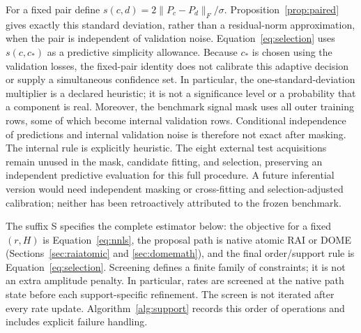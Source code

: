 For a fixed pair define $s(c,d)=2\|P_c-P_d\|_F/\sigma$. Proposition~\ref{prop:paired} gives exactly this standard deviation, rather than a residual-norm approximation, when the pair is independent of validation noise. Equation~\eqref{eq:selection} uses $s(c,c_*)$ as a predictive simplicity allowance. Because $c_*$ is chosen using the validation losses, the fixed-pair identity does not calibrate this adaptive decision or supply a simultaneous confidence set. In particular, the one-standard-deviation multiplier is a declared heuristic; it is not a significance level or a probability that a component is real. Moreover, the benchmark signal mask uses all outer training rows, some of which become internal validation rows. Conditional independence of predictions and internal validation noise is therefore not exact after masking. The internal rule is explicitly heuristic. The eight external test acquisitions remain unused in the mask, candidate fitting, and selection, preserving an independent predictive evaluation for this full procedure. A future inferential version would need independent masking or cross-fitting and selection-adjusted calibration; neither has been retroactively attributed to the frozen benchmark.

The suffix S specifies the complete estimator below: the objective for a fixed $(r,H)$ is Equation~\eqref{eq:nnls}, the proposal path is native atomic RAI or DOME (Sections~\ref{sec:raiatomic} and \ref{sec:domemath}), and the final order/support rule is Equation~\eqref{eq:selection}. Screening defines a finite family of constraints; it is not an extra amplitude penalty. In particular, rates are screened at the native path state before each support-specific refinement. The screen is not iterated after every rate update. Algorithm~\ref{alg:support} records this order of operations and includes explicit failure handling.

